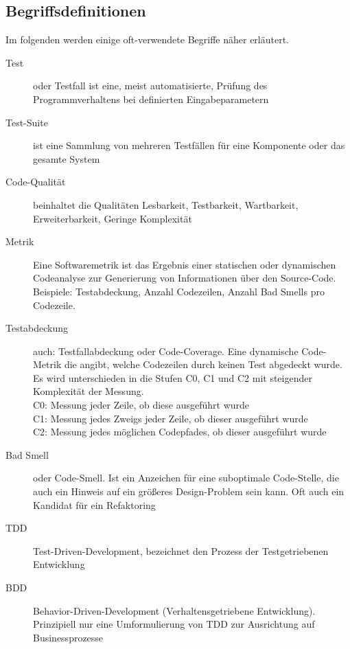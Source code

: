 \subsection{Begriffsdefinitionen}
Im folgenden werden einige oft-verwendete Begriffe näher erläutert.
\begin{description}
 \item[Test] oder Testfall ist eine, meist automatisierte, Prüfung des Programmverhaltens bei definierten Eingabeparametern
 \item[Test-Suite] ist eine Sammlung von mehreren Testfällen für eine Komponente oder das gesamte System
 \item[Code-Qualität] beinhaltet die Qualitäten Lesbarkeit, Testbarkeit, Wartbarkeit, Erweiterbarkeit, Geringe Komplexität
 \item[Metrik] Eine Softwaremetrik ist das Ergebnis einer statischen oder dynamischen Codeanalyse zur Generierung von Informationen über den Source-Code. Beispiele: Testabdeckung, Anzahl Codezeilen, Anzahl Bad Smells pro Codezeile.
 
 \item[Testabdeckung] auch: Testfallabdeckung oder Code-Coverage. Eine dynamische Code-Metrik die angibt, welche Codezeilen durch keinen Test abgedeckt wurde. Es wird unterschieden in die Stufen C0, C1 und C2 mit steigender Komplexität der Messung.\\
 C0: Messung jeder Zeile, ob diese ausgeführt wurde\\
 C1: Messung jedes Zweigs jeder Zeile, ob dieser ausgeführt wurde\\
 C2: Messung jedes möglichen Codepfades, ob dieser ausgeführt wurde
 \item[Bad Smell] oder Code-Smell. Ist ein Anzeichen für eine suboptimale Code-Stelle, die auch ein Hinweis auf ein größeres Design-Problem sein kann. Oft auch ein Kandidat für ein Refaktoring
 \item[TDD] Test-Driven-Development, bezeichnet den Prozess der Testgetriebenen Entwicklung
 \item[BDD] Behavior-Driven-Development (Verhaltensgetriebene Entwicklung). Prinzipiell nur eine Umformulierung von TDD zur Ausrichtung auf Businessprozesse
\end{description}